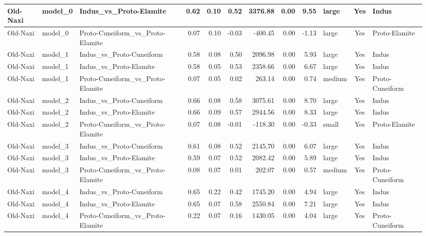 \documentclass[11pt,a4paper,oneside]{report}
\begin{document}
\begin{landscape}
\begin{scriptsize}
\begin{longtable}{|l|l|l|r|r|r|r|r|r|l|c|l|}
Old-Naxi & model\_0 & Indus\_vs\_Proto-Elamite & 0.62 & 0.10 & 0.52 & 3376.88 & 0.00 & 9.55 & large & Yes & Indus \\ \hline
Old-Naxi & model\_0 & Proto-Cuneiform\_vs\_Proto-Elamite & 0.07 & 0.10 & -0.03 & -400.45 & 0.00 & -1.13 & large & Yes & Proto-Elamite \\ \hline
Old-Naxi & model\_1 & Indus\_vs\_Proto-Cuneiform & 0.58 & 0.08 & 0.50 & 2096.98 & 0.00 & 5.93 & large & Yes & Indus \\ \hline
Old-Naxi & model\_1 & Indus\_vs\_Proto-Elamite & 0.58 & 0.05 & 0.53 & 2358.66 & 0.00 & 6.67 & large & Yes & Indus \\ \hline
Old-Naxi & model\_1 & Proto-Cuneiform\_vs\_Proto-Elamite & 0.07 & 0.05 & 0.02 & 263.14 & 0.00 & 0.74 & medium & Yes & Proto-Cuneiform \\ \hline
Old-Naxi & model\_2 & Indus\_vs\_Proto-Cuneiform & 0.66 & 0.08 & 0.58 & 3075.61 & 0.00 & 8.70 & large & Yes & Indus \\ \hline
Old-Naxi & model\_2 & Indus\_vs\_Proto-Elamite & 0.66 & 0.09 & 0.57 & 2944.56 & 0.00 & 8.33 & large & Yes & Indus \\ \hline
Old-Naxi & model\_2 & Proto-Cuneiform\_vs\_Proto-Elamite & 0.07 & 0.08 & -0.01 & -118.30 & 0.00 & -0.33 & small & Yes & Proto-Elamite \\ \hline
Old-Naxi & model\_3 & Indus\_vs\_Proto-Cuneiform & 0.61 & 0.08 & 0.52 & 2145.70 & 0.00 & 6.07 & large & Yes & Indus \\ \hline
Old-Naxi & model\_3 & Indus\_vs\_Proto-Elamite & 0.59 & 0.07 & 0.52 & 2082.42 & 0.00 & 5.89 & large & Yes & Indus \\ \hline
Old-Naxi & model\_3 & Proto-Cuneiform\_vs\_Proto-Elamite & 0.08 & 0.07 & 0.01 & 202.07 & 0.00 & 0.57 & medium & Yes & Proto-Cuneiform \\ \hline
Old-Naxi & model\_4 & Indus\_vs\_Proto-Cuneiform & 0.65 & 0.22 & 0.42 & 1745.20 & 0.00 & 4.94 & large & Yes & Indus \\ \hline
Old-Naxi & model\_4 & Indus\_vs\_Proto-Elamite & 0.65 & 0.07 & 0.58 & 2550.84 & 0.00 & 7.21 & large & Yes & Indus \\ \hline
Old-Naxi & model\_4 & Proto-Cuneiform\_vs\_Proto-Elamite & 0.22 & 0.07 & 0.16 & 1430.05 & 0.00 & 4.04 & large & Yes & Proto-Cuneiform \\ \hline

\end{longtable}
\end{scriptsize}
\end{landscape}
\end{document}
